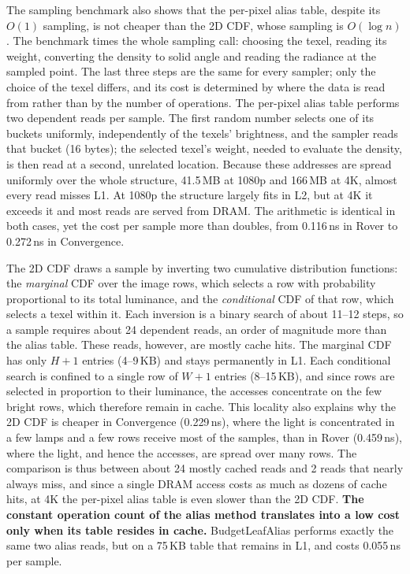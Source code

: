 \documentclass[10pt]{article}
\begin{document}
The sampling benchmark also shows that the per-pixel alias table, despite its $O(1)$ sampling, is not cheaper than the 2D CDF, whose sampling is $O(\log n)$. The benchmark times the whole sampling call: choosing the texel, reading its weight, converting the density to solid angle and reading the radiance at the sampled point. The last three steps are the same for every sampler; only the choice of the texel differs, and its cost is determined by where the data is read from rather than by the number of operations. The per-pixel alias table performs two dependent reads per sample. The first random number selects one of its buckets uniformly, independently of the texels' brightness, and the sampler reads that bucket (16 bytes); the selected texel's weight, needed to evaluate the density, is then read at a second, unrelated location. Because these addresses are spread uniformly over the whole structure, 41.5\,MB at 1080p and 166\,MB at 4K, almost every read misses L1. At 1080p the structure largely fits in L2, but at 4K it exceeds it and most reads are served from DRAM. The arithmetic is identical in both cases, yet the cost per sample more than doubles, from 0.116\,ns in Rover to 0.272\,ns in Convergence.

The 2D CDF draws a sample by inverting two cumulative distribution functions: the \emph{marginal} CDF over the image rows, which selects a row with probability proportional to its total luminance, and the \emph{conditional} CDF of that row, which selects a texel within it. Each inversion is a binary search of about 11--12 steps, so a sample requires about 24 dependent reads, an order of magnitude more than the alias table. These reads, however, are mostly cache hits. The marginal CDF has only $H+1$ entries (4--9\,KB) and stays permanently in L1. Each conditional search is confined to a single row of $W+1$ entries (8--15\,KB), and since rows are selected in proportion to their luminance, the accesses concentrate on the few bright rows, which therefore remain in cache. This locality also explains why the 2D CDF is cheaper in Convergence (0.229\,ns), where the light is concentrated in a few lamps and a few rows receive most of the samples, than in Rover (0.459\,ns), where the light, and hence the accesses, are spread over many rows. The comparison is thus between about 24 mostly cached reads and 2 reads that nearly always miss, and since a single DRAM access costs as much as dozens of cache hits, at 4K the per-pixel alias table is even slower than the 2D CDF. \textbf{The constant operation count of the alias method translates into a low cost only when its table resides in cache.} BudgetLeafAlias performs exactly the same two alias reads, but on a 75\,KB table that remains in L1, and costs 0.055\,ns per sample.
\end{document}
